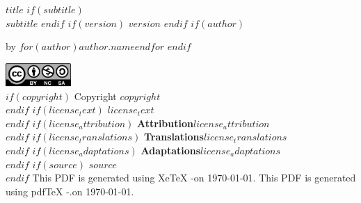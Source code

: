 \documentclass[
    $if(fontsize)$$fontsize$$else$10pt$endif$,
    $if(papersize)$$papersize$$else$letterpaper$endif$,
    titlepage,
    oneside,
    openright,
    $if(draft)$draft$else$final$endif$,
    article]{memoir}
\begin{document}
%
%
\thispagestyle{empty}
\begin{flushleft}
    {\bfseries $title$}
    $if(subtitle)$
        {\\\itshape $subtitle$}
    $endif$
    $if(version)$
        \normalsize {}\space $version$
    $endif$
    \hfill\newline
    $if(author)$

        \normalsize by $for(author)$$author.name$$endfor$
        \vspace*{1em}
    $endif$

    \vspace*{1.5em}

    \includegraphics[keepaspectratio=true, width=2.5cm]{cc_by_nc_sa_40.eps}\\[1.2em]
    \justify
    $if(copyright)$
        \normalsize Copyright \textcopyright\space $copyright$\\[1.2em]
    $endif$
    $if(license_text)$
        \normalsize $license_text$\\[1.2em]
    $endif$
    $if(license_attribution)$
        \normalsize {\bfseries Attribution}\textemdash $license_attribution$\\[1.2em]
    $endif$
    $if(license_translations)$
        \normalsize {\bfseries Translations}\textemdash $license_translations$\\[1.2em]
    $endif$
    $if(license_adaptations)$
        \normalsize {\bfseries Adaptations}\textemdash $license_adaptations$\\[1.2em]
    $endif$
    $if(source)$
        \normalsize $source$\\[1.2em]
    $endif$
    \ifxetex
        \normalsize This PDF is generated using XeTeX \the\eTeXversion\eTeXrevision-\the\XeTeXversion\XeTeXrevision\space on \today.
    \else
        \normalsize This PDF is generated using pdfTeX \the\eTeXversion\eTeXrevision-\the\pdftexversion.\pdftexrevision\space on \today.
    \fi
\end{flushleft}
\pagebreak

\cleardoublepage
\end{document}
